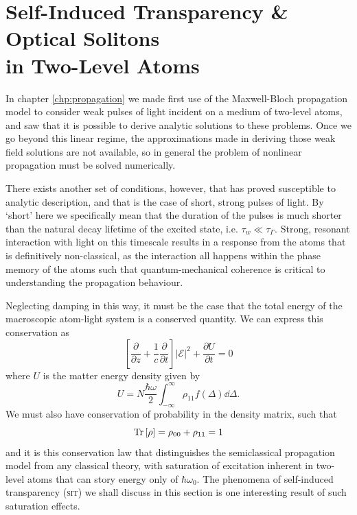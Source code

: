 \section[Self-Induced Transparency \& Optical Solitons]
  {Self-Induced Transparency \& Optical Solitons\\ in Two-Level Atoms}
  \label{sec:sit}


    In chapter \ref{chp:propagation} we made first use of the Maxwell-Bloch
    propagation model to consider weak pulses of light incident on a medium of
    two-level atoms, and saw that it is possible to derive analytic solutions to
    these problems. Once we go beyond this linear regime, the approximations
    made in deriving those weak field solutions are not available, so in general
    the problem of nonlinear propagation must be solved numerically.

    There exists another set of conditions, however, that has proved susceptible
    to analytic description, and that is the case of short, strong pulses of
    light. By `short' here we specifically mean that the duration of the pulses
    is much shorter than the natural decay lifetime of the excited state, i.e.
    $\tau_w \ll \tau_\Gamma$. Strong, resonant interaction with light on this
    timescale results in a response from the atoms that is definitively 
    non-classical, as the interaction all happens within the phase memory of the
    atoms such that quantum-mechanical coherence is critical to understanding
    the propagation behaviour.

    Neglecting damping in this way, it must be the case that the total energy of
    the macroscopic atom-light system is a conserved quantity. We can express
    this conservation as
    \begin{equation}
      \left[ \frac{\partial}{\partial z} + 
      \frac{1}{c}\frac{\partial}{\partial t} \right]
      \lvert \mathcal{E} \rvert^2 + \frac{\partial U}{\partial t} = 0
    \end{equation}
    where $U$ is the matter energy density given by\cite{allen1975optical}
    \begin{equation}
      U = N \frac{\hbar \omega}{2} \int_{-\infty}^{\infty} \rho_{11} f(\Delta)  
      \dd \Delta.
    \end{equation}
    We must also have conservation of probability in the density matrix,
    such that
    \begin{equation}
      \operatorname{Tr}{\left[ \rho \right]} = \rho_{00} + \rho_{11} = 1  
    \end{equation}
    and it is this conservation law that distinguishes the semiclassical
    propagation model from any classical theory, with saturation of excitation
    inherent in two-level atoms that can story energy only of $\hbar \omega_0$.
    The phenomena of self-induced transparency (\textsc{sit}) we shall discuss
    in this section is one interesting result of such saturation effects.

